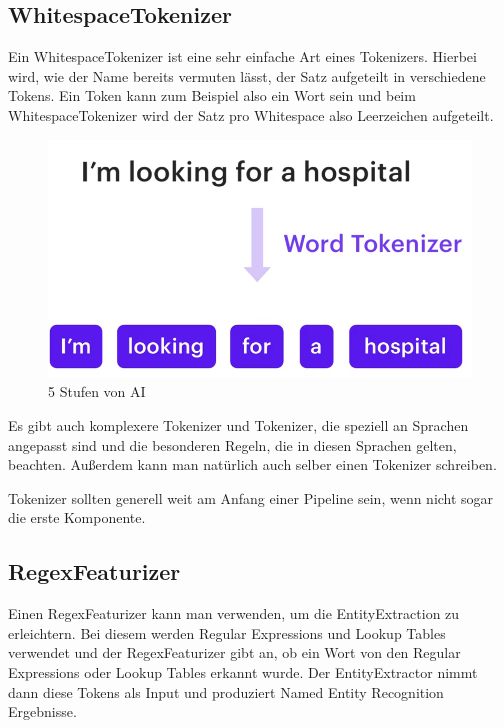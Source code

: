 \subsection{WhitespaceTokenizer}

Ein WhitespaceTokenizer ist eine sehr einfache Art eines Tokenizers.
Hierbei wird, wie der Name bereits vermuten lässt, der Satz aufgeteilt in verschiedene Tokens.
Ein Token kann zum Beispiel also ein Wort sein und beim WhitespaceTokenizer wird der Satz pro Whitespace also Leerzeichen aufgeteilt.\cite{whitespaceTokenizer, rasaMasterclassWhitespaceTokenizer, pipelineComponentsYoutube}

\begin{figure}[hbt!]
  \centering
  \includegraphics[scale=0.25]{pics/whitespacetokenizer}
  \caption{5 Stufen von AI~\cite{pipelineComponentsYoutube}}
  \label{fig:WhitespaceTokenizer}
\end{figure}

Es gibt auch komplexere Tokenizer und Tokenizer, die speziell an Sprachen angepasst sind und die besonderen Regeln, die in diesen Sprachen gelten, beachten.
Außerdem kann man natürlich auch selber einen Tokenizer schreiben.\cite{whitespaceTokenizer, rasaMasterclassWhitespaceTokenizer, pipelineComponentsYoutube}

Tokenizer sollten generell weit am Anfang einer Pipeline sein, wenn nicht sogar die erste Komponente.

\subsection{RegexFeaturizer}

Einen RegexFeaturizer kann man verwenden, um die EntityExtraction zu erleichtern.
Bei diesem werden Regular Expressions und Lookup Tables verwendet und der RegexFeaturizer gibt an, ob ein Wort von den Regular Expressions oder Lookup Tables erkannt wurde.
Der EntityExtractor nimmt dann diese Tokens als Input und produziert Named Entity Recognition Ergebnisse.\cite{rasaMasterclassRegexFeaturizer, pipelineComponentsYoutube, regexFeaturizerCrf}

